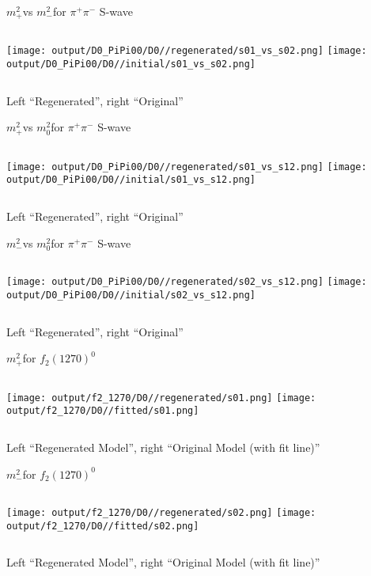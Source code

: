 \documentclass{beamer}
\newcommand{\MP}{\ensuremath{m^2_+}}
\newcommand{\MM}{\ensuremath{m^2_-}}
\newcommand{\MZ}{\ensuremath{m^2_0}}
\begin{document}
\begin{frame}{\MP vs \MM for $\pi^+ \pi^-$ S-wave}
\begin{columns}[t]
\centering
\texttt{[image: output/D0\_PiPi00/D0//regenerated/s01\_vs\_s02.png]}
\centering
\texttt{[image: output/D0\_PiPi00/D0//initial/s01\_vs\_s02.png]}
\end{columns}
    \centering
    Left ``Regenerated'', right ``Original''
\end{frame} 


\begin{frame}{\MP vs \MZ for $\pi^+ \pi^-$ S-wave}
\begin{columns}[t]
\centering
\texttt{[image: output/D0\_PiPi00/D0//regenerated/s01\_vs\_s12.png]}
\centering
\texttt{[image: output/D0\_PiPi00/D0//initial/s01\_vs\_s12.png]}
\end{columns}
    \centering
    Left ``Regenerated'', right ``Original''
\end{frame} 


\begin{frame}{\MM vs \MZ for $\pi^+ \pi^-$ S-wave}
\begin{columns}[t]
\centering
\texttt{[image: output/D0\_PiPi00/D0//regenerated/s02\_vs\_s12.png]}
\centering
\texttt{[image: output/D0\_PiPi00/D0//initial/s02\_vs\_s12.png]}
\end{columns}
    \centering
    Left ``Regenerated'', right ``Original''
\end{frame} 

\begin{frame}{\MP for $f_2(1270)^0$}
\begin{columns}[t]
\centering
\texttt{[image: output/f2\_1270/D0//regenerated/s01.png]}
\centering
\texttt{[image: output/f2\_1270/D0//fitted/s01.png]}
\end{columns}
    \centering
    Left ``Regenerated Model'', right ``Original Model (with fit line)''
\end{frame}                   

\begin{frame}{\MM for $f_2(1270)^0$}
\begin{columns}[t]
\centering
\texttt{[image: output/f2\_1270/D0//regenerated/s02.png]}
\centering
\texttt{[image: output/f2\_1270/D0//fitted/s02.png]}
\end{columns}
    \centering
    Left ``Regenerated Model'', right ``Original Model (with fit line)''
\end{frame}                   
\end{document}
